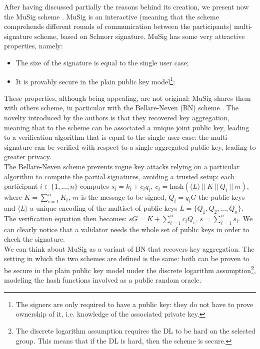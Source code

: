 \bigskip
\noindent
After having discussed partially the reasons behind its creation, we present now the MuSig scheme \cite{RefWork:11}. MuSig is an interactive (meaning that the scheme comprehends different rounds of communication between the participants) multi-signature scheme, based on Schnorr signature. MuSig has some very attractive properties, namely:
\begin{itemize}
	\item The size of the signature is equal to the single user case;
	\item It is provably secure in the plain public key model\footnote{The signers are only required to have a public key: they do not have to prove ownership of it, i.e. knowledge of the associated private key.};
\end{itemize}
These properties, although being appealing, are not original: MuSig shares them with others scheme, in particular with the Bellare-Neven (BN) scheme \cite{RefWork:10}. The novelty introduced by the authors is that they recovered key aggregation, meaning that to the scheme can be associated a unique joint public key, leading to a verification algorithm that is equal to the single user case: the multi-signature can be verified with respect to a single aggregated public key, leading to greater privacy. 
\\
The Bellare-Neven scheme prevents rogue key attacks relying on a particular algorithm to compute the partial signatures, avoiding a trusted setup: each participant $i \in \{1, ..., n\}$ computes $s_i = k_i + c_iq_i, \ c_i = \text{hash}(\langle L \rangle\ || \ K \ || \ Q_i \ || \ m)$, where $K = \sum_{i = 1}^{n}K_i$, $m$ is the message to be signed, $Q_i = q_iG$ the public keys and $\langle L \rangle$ a unique encoding of the multiset of public keys $L = \{Q_1, Q_2, ..., Q_n\}$. The verification equation then becomes: $sG = K + \sum_{i = 1}^{n}c_iQ_i, \ s = \sum_{i = 1}^{n}s_i$. We can clearly notice that a validator needs the whole set of public keys in order to check the signature. 
\\
We can think about MuSig as a variant of BN that recovers key aggregation. The setting in which the two schemes are defined is the same: both can be proven to be secure in the plain public key model under the discrete logarithm assumption\footnote{The discrete logarithm assumption requires the DL to be hard on the selected group. This means that if the DL is hard, then the scheme is secure.}, modeling the hash functions involved as a public random oracle.
\\
